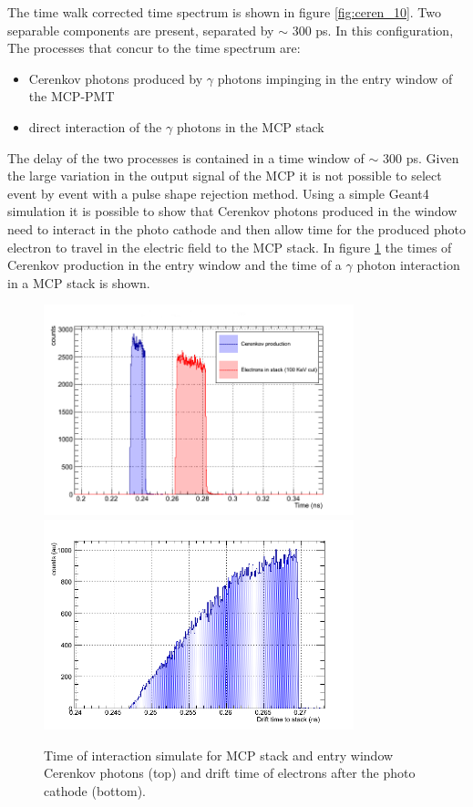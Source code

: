 The time walk corrected time spectrum is shown in figure \ref{fig:ceren_10}. Two separable components are present, separated by $\sim$ 300 ps.
In this configuration, The processes that concur to the time spectrum are:
\begin{itemize}
\item Cerenkov photons produced by $\gamma$ photons impinging in the entry window of the MCP-PMT
\item direct interaction of the $\gamma$ photons in the MCP stack
\end{itemize}
The delay of the two processes is contained in a time window of $\sim$ 300 ps.
Given the large variation in the output signal of the MCP it is not possible to select event by event with a pulse shape rejection method.
Using a simple Geant4 simulation it is possible to show that Cerenkov photons produced in the window need to interact in the photo cathode and then allow time for the produced photo electron to travel in the electric field to the MCP stack. In figure \ref{fig:drift} the times of Cerenkov production in the entry window and the time of a $\gamma$ photon interaction in a MCP stack is shown.
\begin{figure}[htbp]
\begin{center}
\includegraphics[width=9cm]{../Pictures/Chapter_8/interaction_time_spectrum.png}
\includegraphics[width=9cm]{../Pictures/Chapter_8/drift_image_final.png}
\end{center}
\caption[Stack and Cerenkov simulation]{Time of interaction simulate for MCP stack and entry window Cerenkov photons (top) and drift time of electrons after the photo cathode (bottom). }
\label{fig:drift}
\end{figure}
